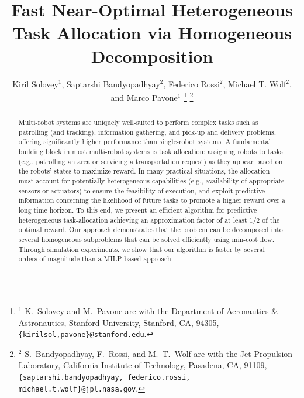 \documentclass[conference]{IEEEtran}
\title{Fast Near-Optimal Heterogeneous Task Allocation via Homogeneous Decomposition}
\author{Kiril Solovey$^1$, Saptarshi Bandyopadhyay$^2$,  Federico Rossi$^2$, Michael T. Wolf$^2$, and Marco Pavone$^1$
\thanks{$^1$ K.\ Solovey and M.\ Pavone are with the Department of Aeronautics \& Astronautics, Stanford University, Stanford, CA, 94305, {\tt \{kirilsol,pavone\}@stanford.edu}.}
\thanks{$^2$ S.\ Bandyopadhyay, F.\ Rossi, and M.\ T.\ Wolf are with the Jet Propulsion Laboratory, California Institute of Technology, Pasadena, CA, 91109, {\tt \{saptarshi.bandyopadhyay, federico.rossi, michael.t.wolf\}@jpl.nasa.gov}.}}
\begin{document}
\maketitle

\begin{abstract}
Multi-robot systems are uniquely well-suited to perform complex tasks such as patrolling (and tracking), information gathering, and pick-up and delivery problems, offering significantly higher performance than single-robot systems. A fundamental building block in most multi-robot systems is task allocation: assigning robots to tasks (e.g., patrolling an area or servicing a transportation request) as they appear based on the robots' states to maximize reward. In many practical situations, the allocation must account for potentially heterogeneous capabilities (e.g., availability of appropriate sensors or actuators) to ensure the feasibility of execution, and exploit predictive information concerning the likelihood of future tasks to promote a higher reward over a long time horizon. To this end, we present an efficient algorithm for predictive heterogeneous task-allocation achieving an approximation factor of at least 1/2 of the optimal reward. Our approach demonstrates that the problem can be decomposed into several homogeneous subproblems that can be solved efficiently using min-cost flow. Through simulation experiments, we show that our algorithm is faster by several orders of magnitude than a MILP-based approach.
\end{abstract}
\end{document}
